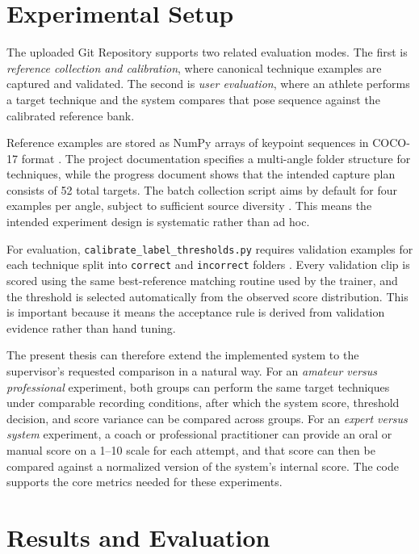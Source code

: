 \documentclass[12pt]{article}
\begin{document}
\section{Experimental Setup}
The uploaded Git Repository supports two related evaluation modes. The first is \textit{reference collection and calibration}, where canonical technique examples are captured and validated. The second is \textit{user evaluation}, where an athlete performs a target technique and the system compares that pose sequence against the calibrated reference bank.

Reference examples are stored as NumPy arrays of keypoint sequences in COCO-17 format \cite{projectActionRecognition}. The project documentation specifies a multi-angle folder structure for techniques, while the progress document shows that the intended capture plan consists of 52 total targets. The batch collection script aims by default for four examples per angle, subject to sufficient source diversity \cite{projectRunBatch}. This means the intended experiment design is systematic rather than ad hoc.

For evaluation, \texttt{calibrate\_label\_thresholds.py} requires validation examples for each technique split into \texttt{correct} and \texttt{incorrect} folders \cite{projectCalibrate}. Every validation clip is scored using the same best-reference matching routine used by the trainer, and the threshold is selected automatically from the observed score distribution. This is important because it means the acceptance rule is derived from validation evidence rather than hand tuning.

The present thesis can therefore extend the implemented system to the supervisor's requested comparison in a natural way. For an \textit{amateur versus professional} experiment, both groups can perform the same target techniques under comparable recording conditions, after which the system score, threshold decision, and score variance can be compared across groups. For an \textit{expert versus system} experiment, a coach or professional practitioner can provide an oral or manual score on a 1--10 scale for each attempt, and that score can then be compared against a normalized version of the system's internal score. The code supports the core metrics needed for these experiments.

\section{Results and Evaluation}
\end{document}
